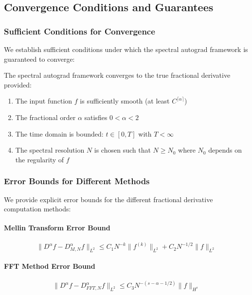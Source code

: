 \subsection{Convergence Conditions and Guarantees}

\subsubsection{Sufficient Conditions for Convergence}

We establish sufficient conditions under which the spectral autograd framework is guaranteed to converge:

\begin{theorem}
The spectral autograd framework converges to the true fractional derivative provided:
\begin{enumerate}
\item The input function $f$ is sufficiently smooth (at least $C^{\lceil \alpha \rceil}$)
\item The fractional order $\alpha$ satisfies $0 < \alpha < 2$
\item The time domain is bounded: $t \in [0, T]$ with $T < \infty$
\item The spectral resolution $N$ is chosen such that $N \geq N_0$ where $N_0$ depends on the regularity of $f$
\end{enumerate}
\end{theorem}

\subsubsection{Error Bounds for Different Methods}

We provide explicit error bounds for the different fractional derivative computation methods:

\paragraph{Mellin Transform Error Bound}
\begin{equation}
\|D^{\alpha} f - D^{\alpha}_{M,N} f\|_{L^2} \leq C_1 N^{-k} \|f^{(k)}\|_{L^2} + C_2 N^{-1/2} \|f\|_{L^2}
\end{equation}

\paragraph{FFT Method Error Bound}
\begin{equation}
\|D^{\alpha} f - D^{\alpha}_{FFT,N} f\|_{L^2} \leq C_3 N^{-(s-\alpha-1/2)} \|f\|_{H^s}
\end{equation}

